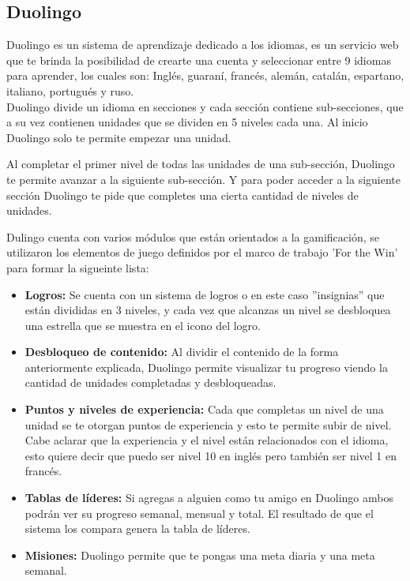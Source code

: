 \begin{multicols}{2}    
\subsection*{Duolingo}
    
    Duolingo es un sistema de aprendizaje dedicado a los idiomas, es un servicio web que te brinda la posibilidad de crearte una cuenta y seleccionar entre 9 idiomas para aprender, los cuales son: Inglés, guaraní, francés, alemán, catalán, espartano, italiano, portugués y ruso.\\
    
    \noindent Duolingo divide un idioma en secciones y cada sección contiene sub-secciones, que a su vez contienen unidades que se dividen en 5 niveles cada una. Al inicio Duolingo solo te permite empezar una unidad.
    
    \noindent Al completar el primer nivel de todas las unidades de una sub-sección, Duolingo te permite avanzar a la siguiente sub-sección. Y para poder acceder a la siguiente sección Duolingo te pide que completes una cierta cantidad de niveles de unidades.\\
    
    
\clearpage
    
    \noindent Dulingo cuenta con varios módulos que están orientados a la gamificación, se utilizaron los elementos de juego definidos por el marco de trabajo 'For the Win' para formar la sigueinte lista:
    
    \begin{itemize}
        \item \textbf{Logros: }Se cuenta con un sistema de logros o en este caso ''insignias'' que están divididas en 3 niveles, y cada vez que alcanzas un nivel se desbloquea una estrella que se muestra en el icono del logro.
        \item \textbf{Desbloqueo de contenido: } Al dividir el contenido de la forma anteriormente explicada, Duolingo permite visualizar tu progreso viendo la cantidad de unidades completadas y desbloqueadas.
        \item \textbf{Puntos y niveles de experiencia: } Cada que completas un nivel de una unidad se te otorgan puntos de experiencia y esto te permite subir de nivel. Cabe aclarar que la experiencia y el nivel están relacionados con el idioma, esto quiere decir que puedo ser nivel 10 en inglés pero también ser nivel 1 en francés.
        \item \textbf{Tablas de líderes: } Si agregas a alguien como tu amigo en Duolingo ambos podrán ver su progreso semanal, mensual y total. El resultado de que el sistema los compara genera la tabla de líderes. 
        \item \textbf{Misiones: } Duolingo permite que te pongas una meta diaria y una meta semanal.
    \end{itemize}



\end{multicols}
